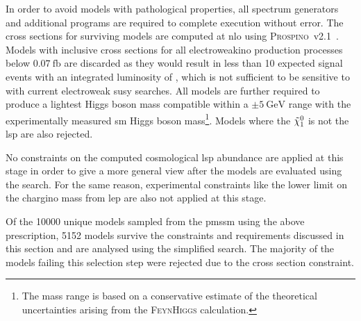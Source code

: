 In order to avoid models with pathological properties, all spectrum generators and additional programs are required to complete execution without error. The cross sections for surviving models are computed at \gls{nlo} using \textsc{Prospino}~v2.1~\cite{prospino:314229, prospino_2:1999xh}. Models with inclusive cross sections for all electroweakino production processes below $\SI{0.07}{\femto\barn}$ are discarded as they would result in less than 10 expected signal events with an integrated luminosity of \onethirtynineifb, which is not sufficient to be sensitive to with current electroweak \gls{susy} searches. 
All models are further required to produce a lightest Higgs boson mass compatible within a $\pm\SI{5}{\GeV}$ range with the experimentally measured \gls{sm} Higgs boson mass\footnote{The mass range is based on a conservative estimate of the theoretical uncertainties arising from the \textsc{FeynHiggs} calculation.}. Models where the $\tilde{\chi}_1^0$ is not the \gls{lsp} are also rejected.

No constraints on the computed cosmological \gls{lsp} abundance are applied at this stage in order to give a more general view after the models are evaluated using the \onelepton search. For the same reason, experimental constraints like the lower limit on the chargino mass from \gls{lep} are also not applied at this stage. 

Of the \num[group-separator={,}]{10000} unique models sampled from the \gls{pmssm} using the above prescription, \num[group-separator={,}]{5152} models survive the constraints and requirements discussed in this section and are analysed using the simplified \onelepton search. The majority of the models failing this selection step were rejected due to the cross section constraint.

